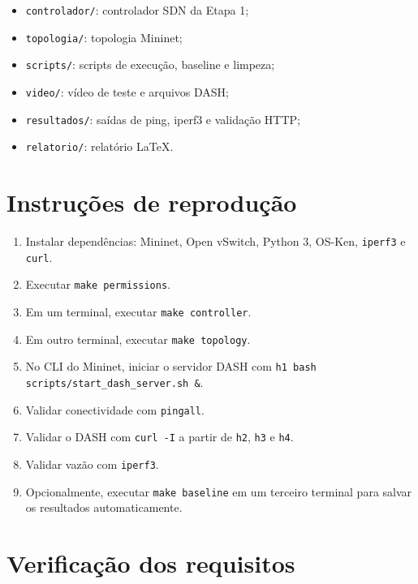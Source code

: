 \documentclass[12pt,a4paper]{article}
\begin{document}
\begin{itemize}
    \item \texttt{controlador/}: controlador SDN da Etapa 1;
    \item \texttt{topologia/}: topologia Mininet;
    \item \texttt{scripts/}: scripts de execução, baseline e limpeza;
    \item \texttt{video/}: vídeo de teste e arquivos DASH;
    \item \texttt{resultados/}: saídas de ping, iperf3 e validação HTTP;
    \item \texttt{relatorio/}: relatório LaTeX.
\end{itemize}

\section{Instruções de reprodução}

\begin{enumerate}
    \item Instalar dependências: Mininet, Open vSwitch, Python 3, OS-Ken, \texttt{iperf3} e \texttt{curl}.
    \item Executar \texttt{make permissions}.
    \item Em um terminal, executar \texttt{make controller}.
    \item Em outro terminal, executar \texttt{make topology}.
    \item No CLI do Mininet, iniciar o servidor DASH com \texttt{h1 bash scripts/start\_dash\_server.sh \&}.
    \item Validar conectividade com \texttt{pingall}.
    \item Validar o DASH com \texttt{curl -I} a partir de \texttt{h2}, \texttt{h3} e \texttt{h4}.
    \item Validar vazão com \texttt{iperf3}.
    \item Opcionalmente, executar \texttt{make baseline} em um terceiro terminal para salvar os resultados automaticamente.
\end{enumerate}

\section{Verificação dos requisitos}
\end{document}
